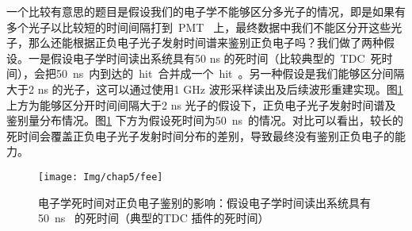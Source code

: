


一个比较有意思的题目是假设我们的电子学不能够区分多光子的情况，即是如果有多个光子以比较短的时间间隔打到~PMT~ 上，最终数据中我们不能区分开这些光子，那么还能根据正负电子光子发射时间谱来鉴别正负电子吗？我们做了两种假设。一是假设电子学时间读出系统具有50 ns 的死时间（比较典型的~TDC~死时间），会把50~ns~内到达的~hit~合并成一个~hit~。另一种假设是我们能够区分间隔大于2 ns 的光子，这可以通过使用1 GHz 波形采样读出及后续波形重建实现。图\ref{fig:p511} 上方为能够区分开时间间隔大于2 ns 光子的假设下，正负电子光子发射时间谱及鉴别量分布情况。图\ref{fig:p511} 下方为假设死时间为50~ns~的情况。对比可以看出，较长的死时间会覆盖正负电子光子发射时间分布的差别，导致最终没有鉴别正负电子的能力。

\begin{figure}[!htbp]
  \centering
   \texttt{[image: Img/chap5/fee]}
    \caption{电子学死时间对正负电子鉴别的影响：假设电子学时间读出系统具有50~ns~ 的死时间（典型的TDC 插件的死时间）}
  \label{fig:p511}
\end{figure}

